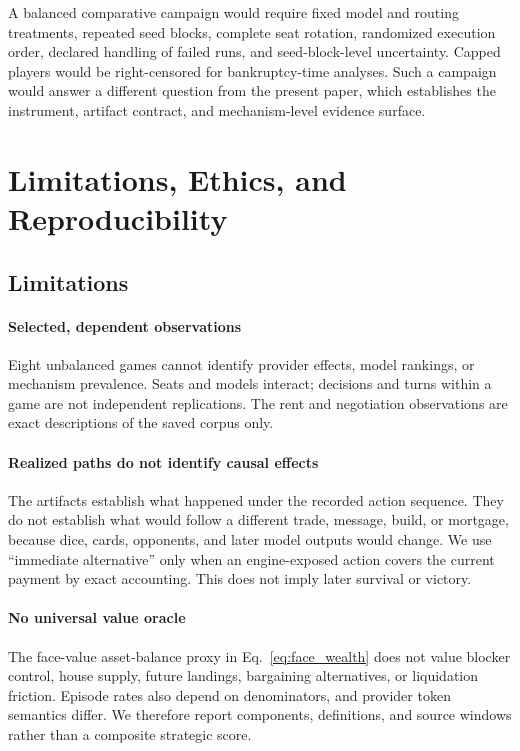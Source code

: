 \documentclass[conference]{IEEEtran}
\begin{document}
A balanced comparative campaign would require fixed model and routing
treatments, repeated seed blocks, complete seat rotation, randomized execution
order, declared handling of failed runs, and seed-block-level uncertainty.
Capped players would be right-censored for bankruptcy-time analyses. Such a
campaign would answer a different question from the present paper, which
establishes the instrument, artifact contract, and mechanism-level evidence
surface.

\section{Limitations, Ethics, and Reproducibility}
\label{sec:limitations}

\subsection{Limitations}

\paragraph{Selected, dependent observations}
Eight unbalanced games cannot identify provider effects, model rankings, or
mechanism prevalence. Seats and models interact; decisions and turns within a
game are not independent replications. The rent and negotiation observations
are exact descriptions of the saved corpus only.

\paragraph{Realized paths do not identify causal effects}
The artifacts establish what happened under the recorded action sequence.
They do not establish what would follow a different trade, message, build, or
mortgage, because dice, cards, opponents, and later model outputs would
change. We use ``immediate alternative'' only when an engine-exposed action covers
the current payment by exact accounting. This does not imply later survival
or victory.

\paragraph{No universal value oracle}
The face-value asset-balance proxy in Eq.~\eqref{eq:face_wealth} does not value blocker
control, house supply, future landings, bargaining alternatives, or
liquidation friction. Episode rates also depend on denominators, and provider
token semantics differ. We therefore report components, definitions, and
source windows rather than a composite strategic score.
\end{document}
